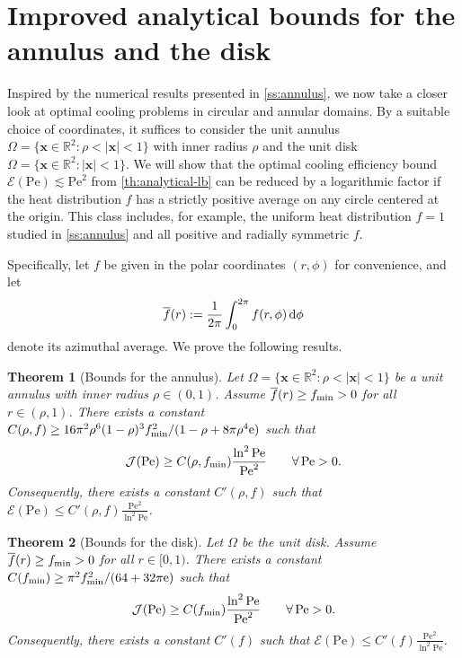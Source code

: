 \documentclass[a4paper, 10pt]{amsart}
\numberwithin{equation}{section}
\theoremstyle{plain}
\newtheorem{theorem}{Theorem}[section]
\theoremstyle{definition}
\theoremstyle{remark}
\newcommand{\R}{\mathbb{R}}
\newcommand{\Pe}{\mathrm{Pe}}
\renewcommand{\vec}[1]{\mathbf{#1}}
\newcommand{\abs}[1]{\left\vert #1 \right\vert}
\newcommand{\e}{{\rm e}}
\newcommand{\ocpval}{\mathcal{J}}
\newcommand{\efficiency}{\mathcal{E}}
\begin{document}
\section{Improved analytical bounds for the annulus and the disk}
\label{s:improved-bounds}

Inspired by the numerical results presented in \cref{ss:annulus}, we now take a closer look at optimal cooling problems in circular and annular domains. By a suitable choice of coordinates, it suffices to consider the unit annulus $\Omega=\{\vec{x}\in\R^2: \rho < \abs{\vec{x}} < 1\}$ with inner radius $\rho$ and the unit disk $\Omega=\{\vec{x}\in\R^2: \abs{\vec{x}} < 1\}$. We will show that the optimal cooling efficiency bound $\efficiency(\Pe) \lesssim \Pe^{2}$ from \cref{th:analytical-lb} can be reduced by a logarithmic factor if the heat distribution $f$ has a strictly positive average on any circle centered at the origin. This class includes, for example, the uniform heat distribution $f=1$ studied in \cref{ss:annulus} and all positive and radially symmetric $f$.


Specifically, let $f$ be given in the polar coordinates $(r,\phi)$ for convenience, and let
\begin{equation*}
    \overline{f}(r) := \frac{1}{2\pi}
    \int_0^{2\pi} f(r,\phi) \, {\rm d}
    \phi
\end{equation*}
denote its azimuthal average.
We prove the following results.

\begin{theorem}[Bounds for the annulus]
\label{th:refined-annulus}
    Let $\Omega=\{\vec{x}\in\R^2: \rho < \abs{\vec{x}} < 1\}$ be a unit annulus with inner radius $\rho \in(0,1)$. 
    Assume $\overline{f}(r) \geq f_{\rm{min}} > 0$ for all $r \in (\rho,1)$. There exists a constant $C(\rho,f) \geq 16 \pi^2 \rho^6 (1-\rho)^3 f_{\rm min}^2 / (1-\rho + 8\pi\rho^4 \e)$ such that
    \begin{equation*}
        \ocpval(\Pe) \geq 
        C(\rho,f_{\rm min}) \frac{\ln^2 \Pe}{\Pe^2} \qquad \forall \, \Pe>0.
    \end{equation*}
    Consequently, there exists a constant $C'(\rho,f)$ such that $\efficiency(\Pe) \leq C'(\rho,f) \frac{\Pe^2}{\ln^2 \Pe}$.
\end{theorem}

\begin{theorem}[Bounds for the disk]
\label{th:refined-disk}
    Let $\Omega$ be the unit disk. Assume $\overline{f}(r) \geq f_{\rm{min}} > 0$ for all $r \in [0,1)$. There exists a constant $C(f_{\rm min}) \geq \pi^2 f_{\rm min}^2 / (64 + 32 \pi \e)$ such that
    \begin{equation*}
        \ocpval(\Pe) \geq 
        C(f_{\rm min}) \frac{\ln^2 \Pe}{\Pe^2} \qquad \forall \, \Pe>0.
    \end{equation*}
    Consequently, there exists a constant $C'(f)$ such that $\efficiency(\Pe) \leq C'(f) \frac{\Pe^2}{\ln^2 \Pe}$.
\end{theorem}
\end{document}
